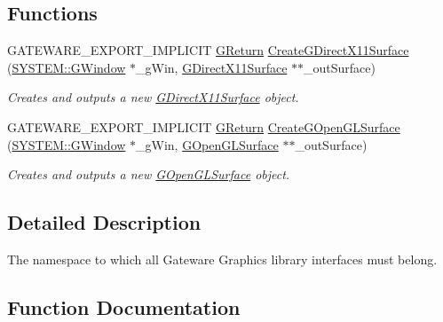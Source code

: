 \subsection*{Functions}
\begin{DoxyCompactItemize}
\item 
G\+A\+T\+E\+W\+A\+R\+E\+\_\+\+E\+X\+P\+O\+R\+T\+\_\+\+I\+M\+P\+L\+I\+C\+IT \hyperlink{namespaceGW_a67a839e3df7ea8a5c5686613a7a3de21}{G\+Return} \hyperlink{namespaceGW_1_1GRAPHICS_ae6c30e057a2894d24db7927d44144a33}{Create\+G\+Direct\+X11\+Surface} (\hyperlink{classGW_1_1SYSTEM_1_1GWindow}{S\+Y\+S\+T\+E\+M\+::\+G\+Window} $\ast$\+\_\+g\+Win, \hyperlink{classGW_1_1GRAPHICS_1_1GDirectX11Surface}{G\+Direct\+X11\+Surface} $\ast$$\ast$\+\_\+out\+Surface)
\begin{DoxyCompactList}\small\item\em Creates and outputs a new \hyperlink{classGW_1_1GRAPHICS_1_1GDirectX11Surface}{G\+Direct\+X11\+Surface} object. \end{DoxyCompactList}\item 
G\+A\+T\+E\+W\+A\+R\+E\+\_\+\+E\+X\+P\+O\+R\+T\+\_\+\+I\+M\+P\+L\+I\+C\+IT \hyperlink{namespaceGW_a67a839e3df7ea8a5c5686613a7a3de21}{G\+Return} \hyperlink{namespaceGW_1_1GRAPHICS_a932844b32a1621800856778481f5548c}{Create\+G\+Open\+G\+L\+Surface} (\hyperlink{classGW_1_1SYSTEM_1_1GWindow}{S\+Y\+S\+T\+E\+M\+::\+G\+Window} $\ast$\+\_\+g\+Win, \hyperlink{classGW_1_1GRAPHICS_1_1GOpenGLSurface}{G\+Open\+G\+L\+Surface} $\ast$$\ast$\+\_\+out\+Surface)
\begin{DoxyCompactList}\small\item\em Creates and outputs a new \hyperlink{classGW_1_1GRAPHICS_1_1GOpenGLSurface}{G\+Open\+G\+L\+Surface} object. \end{DoxyCompactList}\end{DoxyCompactItemize}


\subsection{Detailed Description}
The namespace to which all Gateware Graphics library interfaces must belong. 

\subsection{Function Documentation}
\mbox{\label{namespaceGW_1_1GRAPHICS_ae6c30e057a2894d24db7927d44144a33}} 
